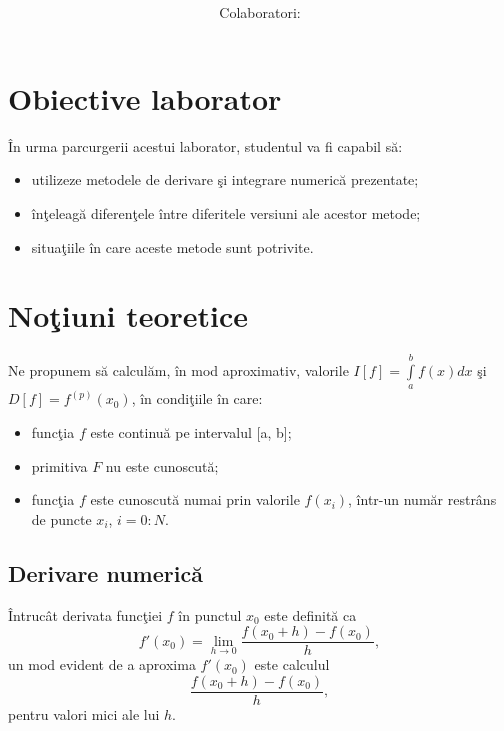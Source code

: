 \documentclass{exam}
\title{
	\textmd{\textbf{\MNLabTitle}}
	\author{Colaboratori: \MNAuthor}
}
\begin{document}
\begin{coverpages}

	\maketitle
	\tableofcontents

\end{coverpages}

\section{Obiective laborator}

În urma parcurgerii acestui laborator, studentul va fi capabil să:
\begin{itemize}
	\item
	      utilizeze metodele de derivare \c{s}i integrare numeric\u{a} prezentate;
	\item
	      \^{i}n\c{t}eleag\u{a} diferen\c{t}ele între diferitele versiuni ale acestor metode;
	\item
	      situa\c{t}iile \^{i}n care aceste metode sunt potrivite.
\end{itemize}

\section{No\c{t}iuni teoretice}
Ne propunem s\u{a} calcul\u{a}m, \^{i}n mod aproximativ, valorile $I[f]=\int\limits_{a}^{b}f(x)dx$ \c{s}i $D[f]=f^{(p)}(x_0)$, \^{i}n condi\c{t}iile \^{i}n care:
\begin{itemize}
	\item func\c{t}ia $f$ este continu\u{a} pe intervalul [a, b];
	\item primitiva $F$ nu este cunoscut\u{a};
	\item func\c{t}ia $f$ este cunoscut\u{a} numai prin valorile $f(x_i)$, într-un num\u{a}r restr\^{a}ns de puncte $x_i$, $i = 0 : N.$
\end{itemize}

\subsection{Derivare numeric\u{a}}

\^{I}ntruc\^{a}t derivata func\c{t}iei $f$ \^{i}n punctul $x_0$ este definit\u{a} ca
$$f'(x_0)=\lim\limits_{h\rightarrow0}\frac{f(x_0+h)-f(x_0)}{h},$$
un mod evident de a aproxima $f'(x_0)$ este calculul
$$\frac{f(x_0+h)-f(x_0)}{h},$$
pentru valori mici ale lui $h$.
\end{document}
